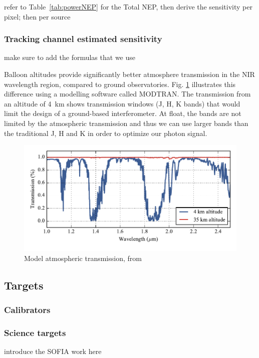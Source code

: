 refer to Table~\ref{tab:powerNEP} for the Total NEP, then derive the sensitivity per pixel; then per source


\subsubsection{Tracking channel estimated sensitivity}
make sure to add the formulas that we use

Balloon altitudes provide significantly better atmosphere transmission in the NIR wavelength region, compared to ground observatories. Fig. \ref{fig:trans} illustrates this difference using a modelling software called MODTRAN. The transmission from an altitude of 4~km shows transmission windows (J, H, K bands) that would limit the design of a ground-based interferometer. At float, the bands are not limited by the atmospheric transmission and thus we can use larger bands than the traditional J, H and K in order to optimize our photon signal.

\begin{figure}[ht!]
\begin{center}
\includegraphics[width=\textwidth]{Figures/BETTII_atmo_transmission.pdf}
\caption{Model atmospheric transmission, from \cite{Rizzo:2012jp}}
\label{fig:trans}
\end{center}
\end{figure}


\subsection{Targets}


\subsubsection{Calibrators}
\subsubsection{Science targets}
introduce the SOFIA work here

